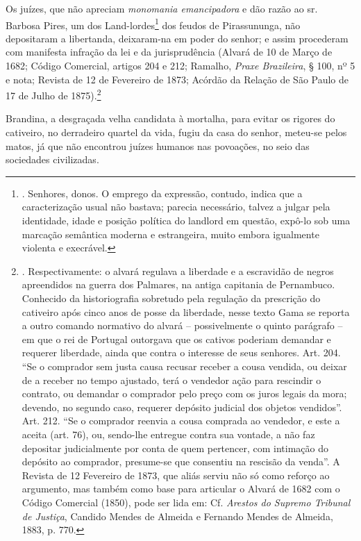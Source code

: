 Os juízes, que não apreciam \emph{monomania emancipadora} e dão razão ao
sr. Barbosa Pires, um dos Land-lordes\footnote{. Senhores, donos. O
  emprego da expressão, contudo, indica que a caracterização usual não
  bastava; parecia necessário, talvez a julgar pela identidade, idade e
  posição política do landlord em questão, expô-lo sob uma marcação
  semântica moderna e estrangeira, muito embora igualmente violenta e
  execrável.} dos feudos de Pirassununga, não depositaram a libertanda,
deixaram-na em poder do senhor; e assim procederam com manifesta
infração da lei e da jurisprudência (Alvará de 10 de Março de 1682;
Código Comercial, artigos 204 e 212; Ramalho, \emph{Praxe Brazileira}, §
100, nº 5 e nota; Revista de 12 de Fevereiro de 1873; Acórdão da Relação
de São Paulo de 17 de Julho de 1875).\footnote{. Respectivamente: o
  alvará regulava a liberdade e a escravidão de negros apreendidos na
  guerra dos Palmares, na antiga capitania de Pernambuco. Conhecido da
  historiografia sobretudo pela regulação da prescrição do cativeiro
  após cinco anos de posse da liberdade, nesse texto Gama se reporta a
  outro comando normativo do alvará -- possivelmente o quinto parágrafo
  -- em que o rei de Portugal outorgava que os cativos poderiam demandar
  e requerer liberdade, ainda que contra o interesse de seus senhores.
  Art. 204. ``Se o comprador sem justa causa recusar receber a cousa
  vendida, ou deixar de a receber no tempo ajustado, terá o vendedor
  ação para rescindir o contrato, ou demandar o comprador pelo preço com
  os juros legais da mora; devendo, no segundo caso, requerer depósito
  judicial dos objetos vendidos''. Art. 212. ``Se o comprador reenvia a
  cousa comprada ao vendedor, e este a aceita (art. 76), ou, sendo-lhe
  entregue contra sua vontade, a não faz depositar judicialmente por
  conta de quem pertencer, com intimação do depósito ao comprador,
  presume-se que consentiu na rescisão da venda''. A Revista de 12
  Fevereiro de 1873, que aliás serviu não só como reforço ao argumento,
  mas também como base para articular o Alvará de 1682 com o Código
  Comercial (1850), pode ser lida em: Cf. \emph{Arestos do Supremo
  Tribunal de Justiça}, Candido Mendes de Almeida e Fernando Mendes de
  Almeida, 1883, p. 770.}

Brandina, a desgraçada velha candidata à mortalha, para evitar os
rigores do cativeiro, no derradeiro quartel da vida, fugiu da casa do
senhor, meteu-se pelos matos, já que não encontrou juízes humanos nas
povoações, no seio das sociedades civilizadas.

